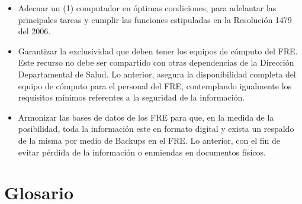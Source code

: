 \documentclass[
]{book}
\begin{document}
\begin{itemize}
\item
  Adecuar un (1) computador en óptimas condiciones, para adelantar las principales tareas y cumplir las funciones estipuladas en la Resolución 1479 del 2006.
\item
  Garantizar la exclusividad que deben tener los equipos de cómputo del FRE. Este recurso no debe ser compartido con otras dependencias de la Dirección Departamental de Salud. Lo anterior, asegura la disponibilidad completa del equipo de cómputo para el personal del FRE, contemplando igualmente los requisitos mínimos referentes a la seguridad de la información.
\item
  Armonizar las bases de datos de los FRE para que, en la medida de la posibilidad, toda la información este en formato digital y exista un respaldo de la misma por medio de Backups en el FRE. Lo anterior, con el fin de evitar pérdida de la información o enmiendas en documentos físicos.
\end{itemize}

\hypertarget{glosario}{%
\chapter*{Glosario}\label{glosario}}
\end{document}
